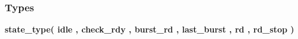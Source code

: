 \subsubsection*{Types}
 \begin{DoxyCompactItemize}
\item 
{\bfseries {\bf state\+\_\+type}{\bfseries \textcolor{vhdlchar}{(}\textcolor{vhdlchar}{ }\textcolor{vhdlchar}{idle}\textcolor{vhdlchar}{ }\textcolor{vhdlchar}{,}\textcolor{vhdlchar}{ }\textcolor{vhdlchar}{check\+\_\+rdy}\textcolor{vhdlchar}{ }\textcolor{vhdlchar}{,}\textcolor{vhdlchar}{ }\textcolor{vhdlchar}{burst\+\_\+rd}\textcolor{vhdlchar}{ }\textcolor{vhdlchar}{,}\textcolor{vhdlchar}{ }\textcolor{vhdlchar}{last\+\_\+burst}\textcolor{vhdlchar}{ }\textcolor{vhdlchar}{,}\textcolor{vhdlchar}{ }\textcolor{vhdlchar}{rd}\textcolor{vhdlchar}{ }\textcolor{vhdlchar}{,}\textcolor{vhdlchar}{ }\textcolor{vhdlchar}{rd\+\_\+stop}\textcolor{vhdlchar}{ }\textcolor{vhdlchar}{)}\textcolor{vhdlchar}{ }}} 
\end{DoxyCompactItemize}
